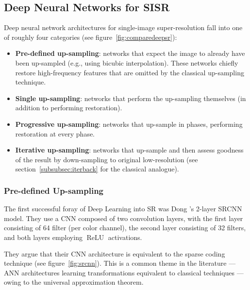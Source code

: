 \subsection{Deep Neural Networks for SISR}

Deep neural network architectures for single-image super-resolution fall into one of roughly four categories (see figure~\ref{fig:comparedeepsr}):
\begin{framed}
    \begin{itemize}
        \item \textbf{Pre-defined up-sampling}: networks that expect the image to already have been up-sampled (e.g., using bicubic interpolation). These networks chiefly restore high-frequency features that are omitted by the classical up-sampling technique.
        \item \textbf{Single up-sampling}: networks that perform the up-sampling themselves (in addition to performing restoration).
        \item \textbf{Progressive up-sampling}: networks that up-sample in phases, performing restoration at every phase.
        \item \textbf{Iterative up-sampling}: networks that up-sample and then assess goodness of the result by down-sampling to original low-resolution (see section~\ref{subsubsec:iterback} for the classical analogue).
    \end{itemize}
\end{framed}
\subsubsection{Pre-defined Up-sampling}\label{subsubsec:vdsr}
The first successful foray of Deep Learning into SR was Dong \etal's 2-layer SRCNN model\cite{Dong_2016}.
%
They use a CNN composed of two convolution layers, with the first layer consisting of 64 filter (per color channel), the second layer consisting of 32 filters, and both layers employing \(\operatorname{ReLU}\) activations.
%

They argue that their CNN architecture is equivalent to the sparse coding technique (see figure~\ref{fig:srcnn}).
%
This is a common theme in the literature --- ANN architectures learning transformations equivalent to classical techniques --- owing to the universal approximation theorem.

